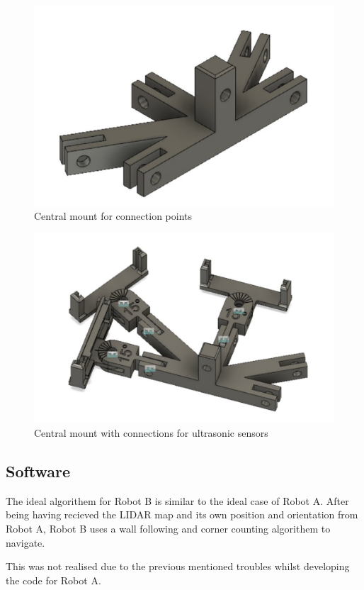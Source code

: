 \documentclass[11pt]{article}
\begin{document}
	\begin{figure}[h!]
		\centering
		\includegraphics[scale=0.5]{central_mount_empty}
		\caption{Central mount for connection points}
	\end{figure}

	\begin{figure}[h!]
		\centering
		\includegraphics[scale=0.5]{central_mount_conns}
		\caption{Central mount with connections for ultrasonic sensors}
	\end{figure}

	\pagebreak
	
	\subsection{Software}
	The ideal algorithem for Robot B is similar to the ideal case of Robot A. After being having recieved the LIDAR map and its own position and orientation from Robot A, Robot B uses a wall following and corner counting algorithem to navigate. \newline
	
	This was not realised due to the previous mentioned troubles whilst developing the code for Robot A.
	
\end{document}
